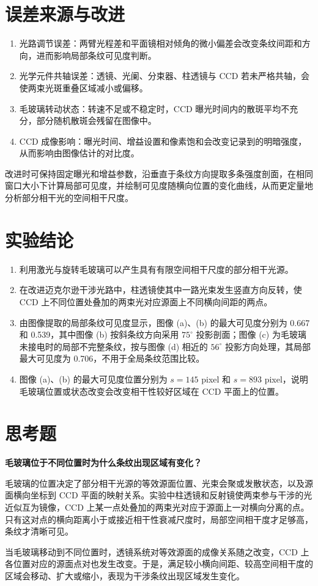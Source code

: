 \documentclass[12pt,a4paper]{article}
\begin{document}
\section{误差来源与改进}
\begin{enumerate}
    \item 光路调节误差：两臂光程差和平面镜相对倾角的微小偏差会改变条纹间距和方向，进而影响局部条纹可见度判断。
    \item 光学元件共轴误差：透镜、光阑、分束器、柱透镜与 CCD 若未严格共轴，会使两束光斑重叠区域减小或偏移。
    \item 毛玻璃转动状态：转速不足或不稳定时，CCD 曝光时间内的散斑平均不充分，部分随机散斑会残留在图像中。
    \item CCD 成像影响：曝光时间、增益设置和像素饱和会改变记录到的明暗强度，从而影响由图像估计的对比度。
\end{enumerate}

改进时可保持固定曝光和增益参数，沿垂直于条纹方向提取多条强度剖面，在相同窗口大小下计算局部可见度，并绘制可见度随横向位置的变化曲线，从而更定量地分析部分相干光的空间相干尺度。

\section{实验结论}
\begin{enumerate}
    \item 利用激光与旋转毛玻璃可以产生具有有限空间相干尺度的部分相干光源。
    \item 在改进迈克尔逊干涉光路中，柱透镜使其中一路光束发生竖直方向反转，使 CCD 上不同位置处叠加的两束光对应源面上不同横向间距的两点。
    \item 由图像提取的局部条纹可见度显示，图像 (a)、(b) 的最大可见度分别为 0.667 和 0.539，其中图像 (b) 按斜条纹方向采用 $75^\circ$ 投影剖面；图像 (c) 为毛玻璃未接电时的局部不完整条纹，按与图像 (d) 相近的 $56^\circ$ 投影方向处理，其局部最大可见度为 0.706，不用于全局条纹范围比较。
    \item 图像 (a)、(b) 的最大可见度位置分别为 $s=145$ pixel 和 $s=893$ pixel，说明毛玻璃位置或状态改变会改变相干性较好区域在 CCD 平面上的位置。
\end{enumerate}

\section{思考题}
\textbf{毛玻璃位于不同位置时为什么条纹出现区域有变化？}

毛玻璃的位置决定了部分相干光源的等效源面位置、光束会聚或发散状态，以及源面横向坐标到 CCD 平面的映射关系。实验中柱透镜和反射镜使两束参与干涉的光近似互为镜像，CCD 上某一点处叠加的两束光对应于源面上一对横向分离的点。只有这对点的横向距离小于或接近相干性衰减尺度时，局部空间相干度才足够高，条纹才清晰可见。

当毛玻璃移动到不同位置时，透镜系统对等效源面的成像关系随之改变，CCD 上各位置对应的源面点对也发生改变。于是，满足较小横向间距、较高空间相干度的区域会移动、扩大或缩小，表现为干涉条纹出现区域发生变化。
\end{document}
